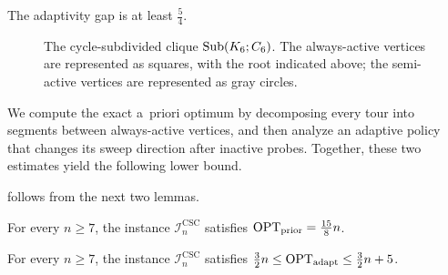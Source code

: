\documentclass[12pt,a4paper,oneside]{report}
\begin{document}
\begin{theorem}\label{thm:cycle-subdivision}
The adaptivity gap is at least $\frac54$.
\end{theorem}

\begin{figure}[htbp]
\centering
{}
\caption{The cycle-subdivided clique $\operatorname{Sub}(K_6;C_6)$. The always-active
vertices are represented as squares, with the root indicated above; the
semi-active vertices are represented as gray circles.}
\label{fig:cycle-subdivision}
\end{figure}

We compute the exact a~priori optimum by decomposing every tour into
segments between always-active vertices, and then analyze an adaptive
policy that changes its sweep direction after inactive probes.  Together,
these two estimates yield the following lower bound.

 follows from the next two lemmas.

\begin{lemma}\label{lem:cycle-prior}
For every $n\ge 7$, the instance $\mathcal{I}_n^{\mathrm{CSC}}$ satisfies
$\operatorname{OPT}_\mathrm{prior}=\frac{15}{8}n$.
\end{lemma}

\begin{lemma}\label{lem:cycle-adapt}
For every $n\ge 7$, the instance $\mathcal{I}_n^{\mathrm{CSC}}$ satisfies
$\frac32n\le\operatorname{OPT}_\mathrm{adapt}\le \frac32n+5$.
\end{lemma}
\end{document}
